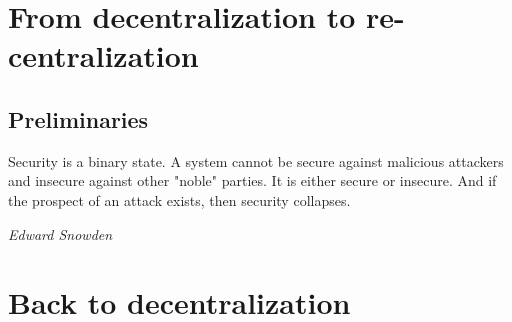 \documentclass[10pt,a4paper]{book}
\begin{document}
%


%


%
\frontmatter

%

%
%
\mainmatter



\part{From decentralization to re-centralization}

\chapter{Preliminaries}

\epigraph{Security is a binary state. A system cannot be secure against malicious attackers and insecure against other "noble" parties. It is either secure or insecure. And if the prospect of an attack exists, then security collapses.}{\emph{Edward Snowden}}







\part{Back to decentralization}



%
%
%
%
\cleardoublepage
{}
{}
%
%
%
\printbibliography[filter=papers,title={Bibliography}]

\printbibliography[heading=subbibintoc,type=misc,title={Web resources}]
\end{document}
